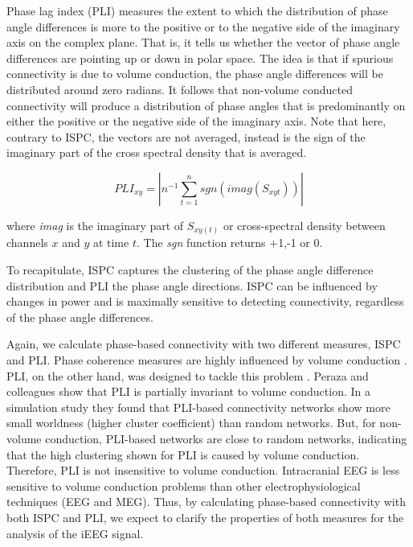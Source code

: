 \documentclass[11pt, onecolumn]{article}
\begin{document}
Phase lag index (PLI) measures the extent to which the distribution of phase angle differences is more to the positive or to the negative side of the imaginary axis on the complex plane. That is, it tells us whether the vector of phase angle differences are pointing up or down in polar space. The idea is that if spurious connectivity is due to volume conduction, the phase angle differences will be distributed around zero radians. It follows that non-volume conducted connectivity will produce a distribution of phase angles that is predominantly on either the positive or the negative side of the imaginary axis. Note that here, contrary to ISPC, the vectors are not averaged, instead is the sign of the imaginary part of the cross spectral density that is averaged.

\begin{equation}
PLI_{xy} = |n^{-1} \sum_{t=1}^{n}sgn(imag(S_{xyt}))|
\label{eq:pli}
\end{equation}

where \textit{imag} is the imaginary part of $S_{xy(t)}$ or cross-spectral density between channels $x$ and $y$ at time $t$.
The \textit{sgn} function returns +1,-1 or 0. %

To recapitulate, ISPC captures the clustering of the phase angle difference distribution and PLI the phase angle directions. ISPC can be influenced by changes in power and is maximally sensitive to detecting connectivity, regardless of the phase angle differences. 

Again, we calculate phase-based connectivity with two different measures, ISPC and PLI. Phase coherence measures are highly influenced by volume conduction  \citep{mormann2000mean}. %
PLI, on the other hand, was designed to tackle this problem \cite{stam2007phase}. Peraza and colleagues \citep{peraza2012volume} show that PLI is partially invariant to volume conduction. In a simulation study they found that PLI-based connectivity networks show more small worldness (higher cluster coefficient) than random networks. But, for non-volume conduction, PLI-based networks are close to random networks, indicating that the high clustering shown for PLI is caused by volume conduction. Therefore, PLI is not insensitive to volume conduction. Intracranial EEG is less sensitive to volume conduction problems than other electrophysiological techniques (EEG and MEG). Thus, by calculating phase-based connectivity with both ISPC and PLI, we expect to clarify the properties of both measures for the analysis of the iEEG signal.
\end{document}

